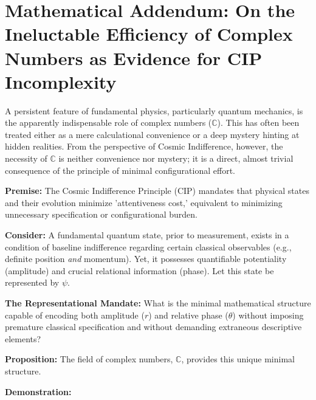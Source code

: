 \documentclass[11pt, a4paper]{article}
\begin{document}


\appendix %
\section{Mathematical Addendum: On the Ineluctable Efficiency of Complex Numbers as Evidence for CIP Incomplexity}

A persistent feature of fundamental physics, particularly quantum mechanics, is the apparently indispensable role of complex numbers ($\mathbb{C}$). This has often been treated either as a mere calculational convenience or a deep mystery hinting at hidden realities. From the perspective of Cosmic Indifference, however, the necessity of $\mathbb{C}$ is neither convenience nor mystery; it is a direct, almost trivial consequence of the principle of minimal configurational effort.

\textbf{Premise:} The Cosmic Indifference Principle (CIP) mandates that physical states and their evolution minimize 'attentiveness cost,' equivalent to minimizing unnecessary specification or configurational burden.

\textbf{Consider:} A fundamental quantum state, prior to measurement, exists in a condition of baseline indifference regarding certain classical observables (e.g., definite position \textit{and} momentum). Yet, it possesses quantifiable potentiality (amplitude) and crucial relational information (phase). Let this state be represented by $\psi$.

\textbf{The Representational Mandate:} What is the minimal mathematical structure capable of encoding both amplitude ($r$) and relative phase ($\theta$) without imposing premature classical specification and without demanding extraneous descriptive elements?

\textbf{Proposition:} The field of complex numbers, $\mathbb{C}$, provides this unique minimal structure.

\textbf{Demonstration:}
\end{document}
